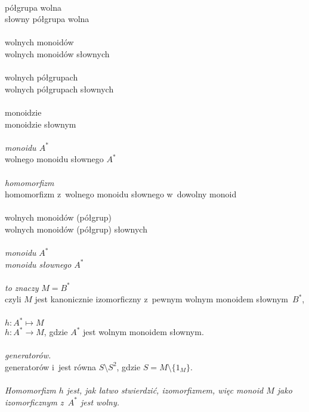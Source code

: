 \documentclass[a4paper,11pt]{article}
\begin{document}
 \\
\Jest  półgrupa wolna \\
\Powin słowny półgrupa wolna \\
 \\
\Jest  wolnych monoidów \\
\Powin wolnych monoidów słownych \\
 \\
\Jest  wolnych półgrupach \\
\Powin wolnych półgrupach słownych \\
 \\
\Jest  monoidzie \\
\Powin monoidzie słownym \\
 \\
\Jest  \textit{monoidu $A^{ * }$} \\
\Powin wolnego monoidu słownego $A^{ * }$ \\
 \\
\Jest  \textit{homomorfizm} \\
\Powin homomorfizm z~wolnego monoidu słownego w~dowolny monoid \\
 \\
\Jest  wolnych monoidów (półgrup) \\
\Powin wolnych monoidów (półgrup) słownych \\
 \\
\Jest  \textit{monoidu} $A^{ * }$ \\
\Powin \textit{monoidu słownego} $A^{ * }$ \\
 \\
\Jest  \textit{to znaczy} $M = B^{ * }$ \\
\Powin czyli $M$ jest kanonicznie izomorficzny z~pewnym wolnym monoidem
słownym~$B^{ * }$, \\
 \\
\Jest  $h : A^{ * } \mapsto M$ \\
\Powin $h : A^{ * } \to M$, gdzie $A^{ * }$ jest wolnym monoidem słownym. \\
 \\
\Jest  \textit{generatorów.} \\
\Powin generatorów i~jest równa $S \setminus S^{ 2 }$, gdzie
  $S = M \setminus \{ 1_{ M } \}$. \\
 \\
\Jest  \textit{Homomorfizm $h$ jest, jak łatwo stwierdzić, izomorfizmem,
  więc monoid $M$ jako izomorficznym z~$A^{ * }$ jest wolny.} \\
\end{document}
